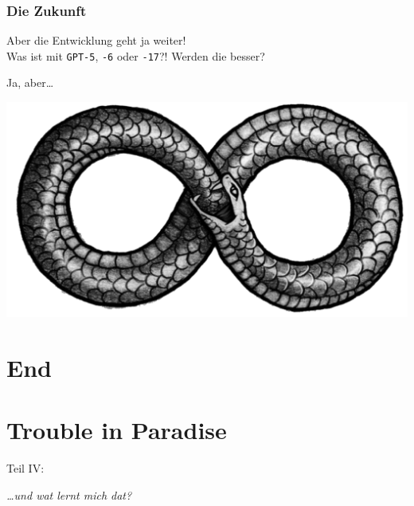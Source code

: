 \documentclass[aspectratio=169,usenames,dvipsnames]{beamer}
\begin{document}
\begin{frame}
\frametitle{Die Zukunft} 
\begin{center}
\Large
Aber die Entwicklung geht ja weiter!\\
Was ist mit \texttt{GPT-5}, \texttt{-6} oder \texttt{-17}?! Werden die besser?
\pause\bigskip

Ja, aber\dots\medskip

\includegraphics[height=0.4\textheight]{images/ouroboros}
\end{center}
\end{frame}


\section{End}

\section{Trouble in Paradise}
\begin{frame}
\begin{center}
\Large
Teil IV:
\bigskip

\huge
\emph{\dots und wat lernt mich dat?}
\end{center}
\end{frame}
\end{document}
